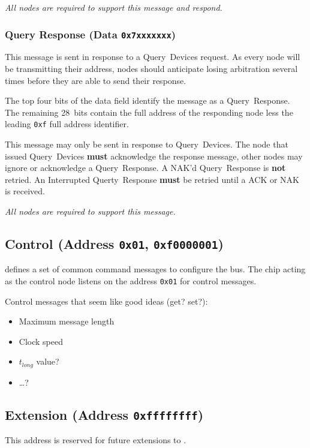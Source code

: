 \medskip
\noindent
\textit{All nodes are required to support this message and respond.}

\subsubsection{Query Response (Data \texttt{0x7xxxxxxx})}
This message is sent in response to a Query~Devices request. As every node
will be transmitting their address, nodes should anticipate losing arbitration
several times before they are able to send their response.

The top four bits of the data field identify the message as a Query~Response.
The remaining 28~bits contain the full address of the responding node less the
leading {\tt 0xf} full address identifier.

This message may only be sent in response to Query~Devices. The node that
issued Query~Devices \textbf{must} acknowledge the response message, other
nodes may ignore or acknowledge a Query~Response. A NAK'd Query~Response is
\textbf{not} retried. An Interrupted Querty~Response \textbf{must} be retried
until a ACK or NAK is received.

\medskip
\noindent
\textit{All nodes are required to support this message.}

\subsection{Control (Address \texttt{0x01}, \texttt{0xf0000001})}
\label{sec:control-control}
\bus defines a set of common command messages to configure the bus. The chip
acting as the control node listens on the address {\tt 0x01} for \bus control
messages.

Control messages that seem like good ideas (get? set?):
\begin{itemize}
  \item Maximum message length
  \item Clock speed
  \item $t_{long}$ value?
  \item \ldots?
\end{itemize}

\subsection{Extension (Address \texttt{0xffffffff})}
This address is reserved for future extensions to \bus.

